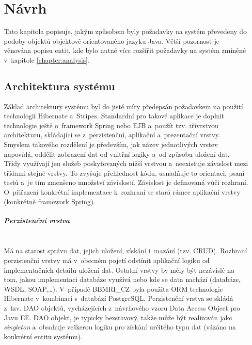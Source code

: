\documentclass[11pt, draft, oneside]{fithesis2}
\newcommand{\paragraphNewLine}[1]{\paragraph*{#1}\mbox{}\\}
\newcommand{\ProjectName}{\mbox{BBMRI\_CZ}\xspace}
\begin{document}
\chapter{Návrh}\label{chapter:proposal}
Tato kapitola popisuje, jakým způsobem byly požadavky na systém převedeny do podoby objektů objektově orientovaného jazyku Java. Větší pozornost je věnována popisu entit, kde bylo nutné více rozšířit požadavky na systém zmíněné v~kapitole \ref{chapter:analysis}.

\section{Architektura systému}
Základ architektury systému byl do jisté míry předepsán požadavkem na použití technologií Hibernate a~Stripes. Standardní pro takové aplikace je doplnit technologie ještě o~framework Spring nebo EJB a~použít tzv. třívrstvou architekturu, skládající se z~perzistenční, aplikační a~prezentační vrstvy. Smyslem takového rozdělení je především, jak název jednotlivých vrstev napovídá, oddělit zobrazení dat od vnitřní logiky a~od způsobu uložení dat. Třídy využívají jen služeb poskytovaných nižší vrstvou a~neexistuje závislost mezi třídami stejné vrstvy. To zvyšuje přehlednost kódu, usnadňuje to orientaci, psaní testů a~je tím zmenšeno množství závislostí. Závislost je definovaná vůči rozhraní. O~přiřazení konkrétní implementace k~rozhraní se stará rámec aplikační vrstvy (konkrétně framework Spring).  

\paragraphNewLine{Perzistenční vrstva}
Má na starost správu dat, jejich uložení, získání i~mazání (tzv. CRUD). Rozhraní perzistenční vrstvy má v~obecném pojetí odstínit aplikační logiku od implementačních detailů uložení dat. Ostatní vrstvy by měly být nezávislé na tom, jakou implementaci databáze využívá nebo kde se data nachází (databáze, WSDL, SOAP,\ldots). V~případě \ProjectName byla použita ORM technologie Hibernate v~kombinaci s~databází PostgreSQL. 
Perzistenční vrstva se skládá z~tzv. DAO objektů, vycházejících z~návrhového vzoru Data Access Object pro Javu EE. DAO objekt, je typicky bezstavový, takže může být realizován jako \textit{singleton} a~obsahuje veškerou logiku pro získání určitého typu dat (vázáno na konkrétní entitu systému).
\end{document}
